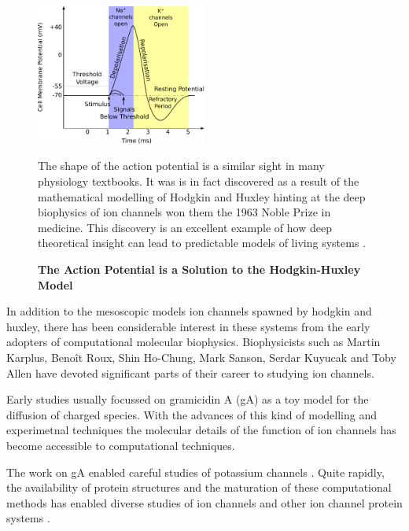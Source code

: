 \begin{figure}
	\begin{center}
		\includegraphics[width=0.5\textwidth]{figures/Hodgkin-Huxley_action_potential.pdf}
	\end{center}
	\captionsetup{singlelinecheck = false, justification=raggedright}
	\caption[The Action Potential is a Solution to the Hodkin-Huxley Model] {\textbf{The Action Potential is a Solution to the Hodgkin-Huxley Model }}{The shape of the action potential is a similar sight in many physiology textbooks. It was is in fact discovered as a result of the mathematical modelling of Hodgkin and Huxley hinting at the deep biophysics of ion channels won them the 1963 Noble Prize in medicine. This discovery is an excellent example of how deep theoretical insight can lead to predictable models of living systems \cite{hodgkin1952, hodgkin1952a, hodgkin1952b, hodgkin1952c, hodgkin1952d}.}
	\label{action_potential_graphic}
\end{figure}

In addition to the mesoscopic models ion channels spawned by hodgkin and huxley, there has been considerable interest in these systems from  the early adopters of computational molecular biophysics. Biophysicists such as Martin Karplus, Beno\^it Roux, Shin Ho-Chung, Mark Sanson, Serdar Kuyucak and Toby Allen have devoted significant parts of their career to studying ion channels\cite{sansom1991, roux1991, sansom1991, allen2003, allen2004, chung2002, tieleman2001}. 

Early studies usually focussed on gramicidin A (gA) as a toy model for the diffusion of charged species. With the advances of this kind of modelling and experimetnal techniques the molecular details of the function of ion channels has become accessible to computational techniques. 

The work on gA enabled careful studies of potassium channels \cite{rashid2013, li2021, flood2021}. Quite rapidly, the availability of protein structures and the maturation of these computational methods has enabled diverse studies of ion channels and other ion channel protein systems \cite{lev2020, chen2021}.


